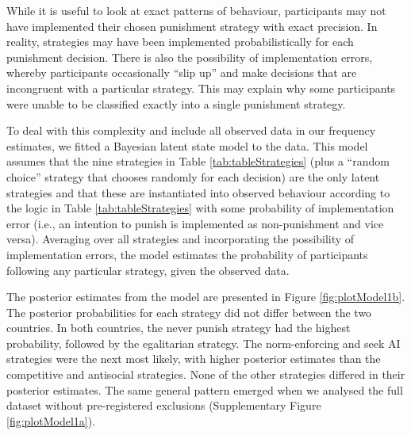 \documentclass[
  man,floatsintext]{apa6}
\begin{document}
While it is useful to look at exact patterns of behaviour, participants may not
have implemented their chosen punishment strategy with exact precision.
In reality, strategies may have been implemented probabilistically for each
punishment decision. There is also the possibility of implementation errors,
whereby participants occasionally ``slip up'' and make decisions that are
incongruent with a particular strategy. This may explain why some participants
were unable to be classified exactly into a single punishment strategy.

To deal with this complexity and include all observed data in our frequency
estimates, we fitted a Bayesian latent state model to the data. This model
assumes that the nine strategies in Table \ref{tab:tableStrategies} (plus a
``random choice'' strategy that chooses randomly for each decision) are the only
latent strategies and that these are instantiated into observed behaviour
according to the logic in Table \ref{tab:tableStrategies} with some
probability of implementation error (i.e., an intention to punish is implemented
as non-punishment and vice versa). Averaging over all strategies and
incorporating the possibility of implementation errors, the model estimates the
probability of participants following any particular strategy, given the
observed data.

The posterior estimates from the model are presented in Figure
\ref{fig:plotModel1b}. The posterior probabilities for each strategy did not
differ between the two countries. In both countries, the never punish strategy
had the highest probability, followed by the egalitarian strategy. The
norm-enforcing and seek AI strategies were the next most likely, with higher
posterior estimates than the competitive and antisocial strategies. None of the
other strategies differed in their posterior estimates. The same general pattern
emerged when we analysed the full dataset without pre-registered exclusions
(Supplementary Figure \ref{fig:plotModel1a}).
\end{document}
